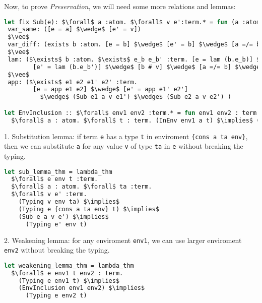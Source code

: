 \documentclass[english, mgr]{iithesis}
\renewcommand{\tt}[1]{\texttt{\small{#1}}}
\renewcommand{\it}[1]{\textit{#1}}
\begin{document}
Now, to prove \it{Preservation}, we will need some more relations and lemmas:
\begin{lstlisting}[mathescape, language=OCaml]
let fix Sub(e): $\forall$ a :atom. $\forall$ v e':term.* = fun (a :atom) (v e' :term) $\rightarrow$
 var_same: ([e = a] $\wedge$ [e' = v])
 $\vee$
 var_diff: (exists b :atom. [e = b] $\wedge$ [e' = b] $\wedge$ [a =/= b])
 $\vee$
 lam: ($\exists$ b :atom. $\exists$ e_b e_b' :term. [e = lam (b.e_b)] $\wedge$
        [e' = lam (b.e_b')] $\wedge$ [b # v] $\wedge$ [a =/= b] $\wedge$ (Sub e_b a v e_b') )
 $\vee$
 app: ($\exists$ e1 e2 e1' e2' :term.
        [e = app e1 e2] $\wedge$ [e' = app e1' e2']
          $\wedge$ (Sub e1 a v e1') $\wedge$ (Sub e2 a v e2') )

let EnvInclusion :: $\forall$ env1 env2 :term.* = fun env1 env2 : term $\rightarrow$
  $\forall$ a : atom. $\forall$ t : term. (InEnv env1 a t) $\implies$ (InEnv env2 a t)
\end{lstlisting}

1. Substitution lemma:
if term \tt{e} has a type \tt{t} in enviroment \tt{\{cons a ta env\}},
then we can substitute \tt{a} for any value \tt{v} of type \tt{ta} in \tt{e} without breaking the typing.
\begin{lstlisting}[mathescape,language=OCaml]
let sub_lemma_thm = lambda_thm
  $\forall$ e env t :term.
  $\forall$ a : atom. $\forall$ ta :term.
  $\forall$ v e' :term.
    (Typing v env ta) $\implies$
    (Typing e {cons a ta env} t) $\implies$
    (Sub e a v e') $\implies$
      (Typing e' env t)
\end{lstlisting}

2. Weakening lemma: for any enviroment \tt{env1}, we can use larger enviroment \tt{env2} without breaking the typing.
\begin{lstlisting}[mathescape,language=OCaml]
let weakening_lemma_thm = lambda_thm
  $\forall$ e env1 t env2 : term.
    (Typing e env1 t) $\implies$
    (EnvInclusion env1 env2) $\implies$
      (Typing e env2 t)
\end{lstlisting}
\end{document}
